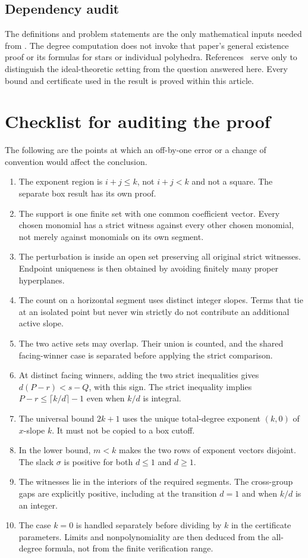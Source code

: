 \documentclass[11pt,a4paper]{article}
\numberwithin{equation}{section}
\theoremstyle{definition}
\theoremstyle{remark}
\begin{document}
\subsection{Dependency audit}

The definitions and problem statements are the only mathematical inputs
needed from \cite{Grigoriev2025}. The degree computation does not invoke that
paper's general existence proof or its formulas for stars or individual
polyhedra. References~\cite{MaclaganRincon,Balanced} serve only to distinguish
the ideal-theoretic setting from the question answered here. Every bound and
certificate used in the result is proved within this article.

\section{Checklist for auditing the proof}
\label{app:proofaudit}

The following are the points at which an off-by-one error or a change of
convention would affect the conclusion.

\begin{enumerate}[leftmargin=1.6em]
\item The exponent region is $i+j\leq k$, not $i+j<k$ and not a square.
The separate box result has its own proof.
\item The support is one finite set with one common coefficient vector.
Every chosen monomial has a strict witness against every other chosen
monomial, not merely against monomials on its own segment.
\item The perturbation is inside an open set preserving all original strict
witnesses. Endpoint uniqueness is then obtained by avoiding finitely many
proper hyperplanes.
\item The count on a horizontal segment uses distinct integer slopes. Terms
that tie at an isolated point but never win strictly do not contribute an
additional active slope.
\item The two active sets may overlap. Their union is counted, and the
shared facing-winner case is separated before applying the strict comparison.
\item At distinct facing winners, adding the two strict inequalities gives
$d(P-r)<s-Q$, with this sign. The strict inequality implies
$P-r\leq\lceil k/d\rceil-1$ even when $k/d$ is integral.
\item The universal bound $2k+1$ uses the unique total-degree exponent
$(k,0)$ of $x$-slope $k$. It must not be copied to a box cutoff.
\item In the lower bound, $m<k$ makes the two rows of exponent vectors
disjoint. The slack $\sigma$ is positive for both $d\leq1$ and $d\geq1$.
\item The witnesses lie in the interiors of the required segments. The
cross-group gaps are explicitly positive, including at the transition $d=1$
and when $k/d$ is an integer.
\item The case $k=0$ is handled separately before dividing by $k$ in the
certificate parameters. Limits and nonpolynomiality are then deduced from
the all-degree formula, not from the finite verification range.
\end{enumerate}
\end{document}
